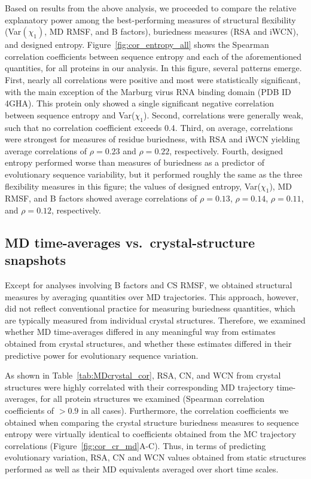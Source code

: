 \documentclass[smallextended]{svjour3}
\begin{document}
Based on results from the above analysis, we proceeded to compare the relative explanatory power among the best-performing measures of structural flexibility (Var$(\chi_1)$, MD RMSF, and B factors), buriedness measures (RSA and iWCN), and designed entropy. Figure~\ref{fig:cor_entropy_all} shows the Spearman correlation coefficients between sequence entropy and each of the aforementioned quantities, for all proteins in our analysis. In this figure, several patterns emerge. First, nearly all correlations were positive and most were statistically significant, with the main exception of the Marburg virus RNA binding domain (PDB ID 4GHA). This protein only showed a single significant negative correlation between sequence entropy and Var($\chi_1$). Second, correlations were generally weak, such that no correlation coefficient exceeds 0.4. Third, on average, correlations were strongest for measures of residue buriedness, with RSA and iWCN yielding average correlations of $\rho=0.23$ and $\rho=0.22$, respectively. Fourth, designed entropy performed worse than measures of buriedness as a predictor of evolutionary sequence variability, but it performed roughly the same as the three flexibility measures in this figure; the values of designed entropy, Var($\chi_1$), MD RMSF, and B factors showed average correlations of $\rho=0.13$, $\rho=0.14$, $\rho=0.11$, and $\rho=0.12$, respectively.


\subsection*{MD time-averages vs.\ crystal-structure snapshots}

Except for analyses involving B factors and CS RMSF, we obtained structural measures by averaging quantities over MD trajectories. This approach, however, did not reflect conventional practice for measuring buriedness quantities, which are typically measured from individual crystal structures. Therefore, we examined whether MD time-averages differed in any meaningful way from estimates obtained from crystal structures, and whether these estimates differed in their predictive power for evolutionary sequence variation.

As shown in Table~\ref{tab:MDcrystal_cor}, RSA, CN, and WCN from crystal structures were highly correlated with their corresponding MD trajectory time-averages, for all protein structures we examined (Spearman correlation coefficients of $>0.9$ in all cases). Furthermore, the correlation coefficients we obtained when comparing the crystal structure buriedness measures to sequence entropy were virtually identical to coefficients obtained from the MC trajectory correlations (Figure~\ref{fig:cor_cr_md}A-C). Thus, in terms of predicting evolutionary variation, RSA, CN and WCN values obtained from static structures performed as well as their MD equivalents averaged over short time scales. 
\end{document}
